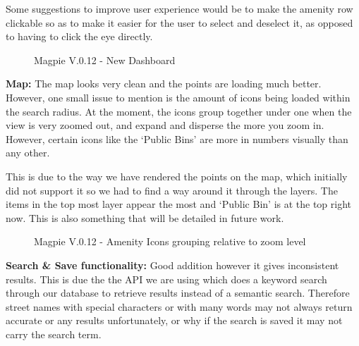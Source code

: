 Some suggestions to improve user experience would be to make the amenity row
clickable so as to make it easier for the user to select and deselect it, as
opposed to having to click the eye directly.
\begin{figure}[h!]
    \centering
    \caption{Magpie V.0.12 - New Dashboard}
\end{figure}

\newpage{}

\textbf{Map: }
The map looks very clean and the points are loading much better. However, one
small issue to mention is the amount of icons being loaded within the search
radius. At the moment, the icons group together under one when the view is very
zoomed out, and expand and disperse the more you zoom in. However, certain icons
like the `Public Bins' are more in numbers visually than any other.

This is due to the way we have rendered the points on the map, which initially
did not support it so we had to find a way around it through the layers. The
items in the top most layer appear the most and `Public Bin' is at the top right
now. This is also something that will be detailed in future work.
\begin{figure}[h!]
    \centering
    \caption{Magpie V.0.12 - Amenity Icons grouping relative to zoom level}
\end{figure}

\textbf{Search \& Save functionality: }
Good addition however it gives inconsistent results. This is due the the API we
are using which does a keyword search through our database to retrieve results
instead of a semantic search. Therefore street names with special characters or
with many words may not always return accurate or any results unfortunately, or
why if the search is saved it may not carry the search term.

